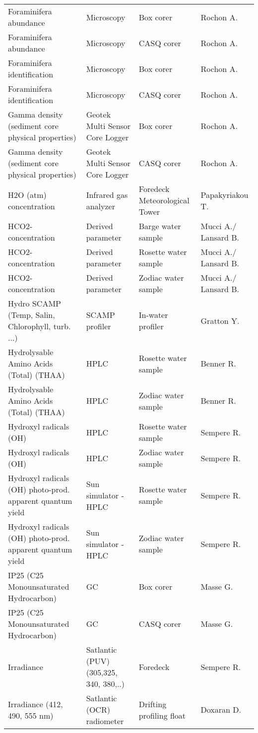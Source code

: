 \begin{landscape}
\begin{longtable}[t]{llll}
Foraminifera abundance & Microscopy & Box corer & Rochon A.\\
\addlinespace
Foraminifera abundance & Microscopy & CASQ corer & Rochon A.\\
Foraminifera identification & Microscopy & Box corer & Rochon A.\\
Foraminifera identification & Microscopy & CASQ corer & Rochon A.\\
Gamma density (sediment core physical properties) & Geotek Multi Sensor Core Logger & Box corer & Rochon A.\\
Gamma density (sediment core physical properties) & Geotek Multi Sensor Core Logger & CASQ corer & Rochon A.\\
\addlinespace
H2O (atm) concentration & Infrared gas analyzer & Foredeck Meteorological Tower & Papakyriakou T.\\
HCO2- concentration & Derived parameter & Barge water sample & Mucci A./ Lansard B.\\
HCO2- concentration & Derived parameter & Rosette water sample & Mucci A./ Lansard B.\\
HCO2- concentration & Derived parameter & Zodiac water sample & Mucci A./ Lansard B.\\
Hydro SCAMP (Temp, Salin, Chlorophyll, turb. ...) & SCAMP profiler & In-water profiler & Gratton Y.\\
\addlinespace
Hydrolysable Amino Acids (Total) (THAA) & HPLC & Rosette water sample & Benner R.\\
Hydrolysable Amino Acids (Total) (THAA) & HPLC & Zodiac water sample & Benner R.\\
Hydroxyl radicals (OH) & HPLC & Rosette water sample & Sempere R.\\
Hydroxyl radicals (OH) & HPLC & Zodiac water sample & Sempere R.\\
Hydroxyl radicals (OH) photo-prod. apparent quantum yield & Sun simulator - HPLC & Rosette water sample & Sempere R.\\
\addlinespace
Hydroxyl radicals (OH) photo-prod. apparent quantum yield & Sun simulator - HPLC & Zodiac water sample & Sempere R.\\
IP25 (C25 Monounsaturated Hydrocarbon) & GC & Box corer & Masse G.\\
IP25 (C25 Monounsaturated Hydrocarbon) & GC & CASQ corer & Masse G.\\
Irradiance & Satlantic (PUV) (305,325, 340, 380,..) & Foredeck & Sempere R.\\
Irradiance (412, 490, 555 nm) & Satlantic (OCR) radiometer & Drifting profiling float & Doxaran D.\\

\end{longtable}
\end{landscape}
